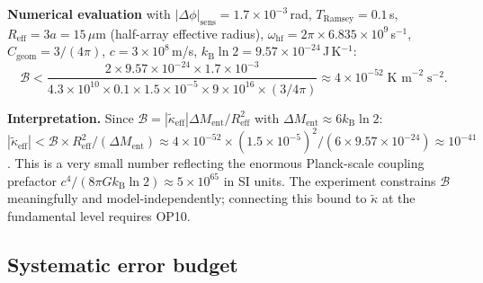 \documentclass[12pt,letterpaper]{article}
\theoremstyle{plain}
\theoremstyle{definition}
\newcommand{\kB}{k_{\mathrm{B}}}
\newcommand{\kt}{\tilde{\kappa}}
\newcommand{\kteff}{\tilde{\kappa}_{\mathrm{eff}}}
\newcommand{\Ment}{M_{\mathrm{ent}}}
\newcommand{\Bobs}{\mathcal{B}}
\begin{document}
\begin{keybox}
\textbf{Numerical evaluation} with $|\Delta\phi|_{\mathrm{sens}} = 1.7\times10^{-3}$\,rad, $T_{\mathrm{Ramsey}} = 0.1$\,s, $R_{\mathrm{eff}} = 3a = 15\,\mu$m (half-array effective radius), $\omega_{\mathrm{hf}} = 2\pi\times6.835\times10^9$\,s$^{-1}$, $C_{\mathrm{geom}} = 3/(4\pi)$, $c = 3\times10^8$\,m/s, $\kB\ln 2 = 9.57\times10^{-24}$\,J\,K$^{-1}$:
\begin{equation}
  \Bobs < \frac{2\times9.57\times10^{-24}\times1.7\times10^{-3}}
               {4.3\times10^{10}\times0.1\times1.5\times10^{-5}\times9\times10^{16}
                \times(3/4\pi)}
  \approx 4\times10^{-52}\;\text{K m}^{-2}\;\text{s}^{-2}.
  \label{eq:bound-numerical}
\end{equation}
\end{keybox}

\textbf{Interpretation.}
Since $\Bobs = |\kteff|\Delta\Ment/R_{\mathrm{eff}}^2$ with $\Delta\Ment \approx 6\kB\ln 2$:
$|\kteff| < \Bobs \times R_{\mathrm{eff}}^2/(\Delta\Ment) \approx 4\times10^{-52} \times (1.5\times10^{-5})^2 / (6\times9.57\times10^{-24}) \approx 10^{-41}$.
This is a very small number reflecting the enormous Planck-scale coupling prefactor $c^4/(8\pi G\kB\ln 2) \approx 5\times10^{65}$ in SI units.  The experiment constrains $\Bobs$ meaningfully and model-independently; connecting this bound to $\kt$ at the fundamental level requires OP10.

\subsection{Systematic error budget}
\end{document}
